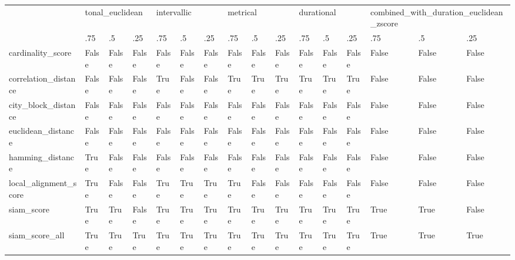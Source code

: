 \begin{tabular}{llllllllllllllll}
\toprule
{} & \multicolumn{3}{l}{tonal\_euclidean} & \multicolumn{3}{l}{intervallic} & \multicolumn{3}{l}{metrical} & \multicolumn{3}{l}{durational} & \multicolumn{3}{l}{combined\_with\_duration\_euclidean\_zscore} \\
{} & .75 & .5 & .25 & .75 & .5 & .25 & .75 & .5 & .25 & .75 & .5 & .25 & .75 & .5 & .25 \\
\midrule
cardinality\_score     & False & False & False & False & False & False & False & False & False & False & False & False & False & False & False \\
correlation\_distance  & False & False & False & True & False & False & True & True & True & True & True & True & False & False & False \\
city\_block\_distance   & False & False & False & False & False & False & False & False & False & False & False & False & False & False & False \\
euclidean\_distance    & False & False & False & False & False & False & False & False & False & False & False & False & False & False & False \\
hamming\_distance      & True & False & False & False & False & False & False & False & False & False & False & False & False & False & False \\
local\_alignment\_score & True & False & False & True & True & True & True & False & False & False & False & False & False & False & False \\
siam\_score            & True & True & False & True & True & True & True & True & True & True & True & True & True & True & False \\
siam\_score\_all        & True & True & True & True & True & True & True & True & True & True & True & True & True & True & True \\
\bottomrule
\end{tabular}

